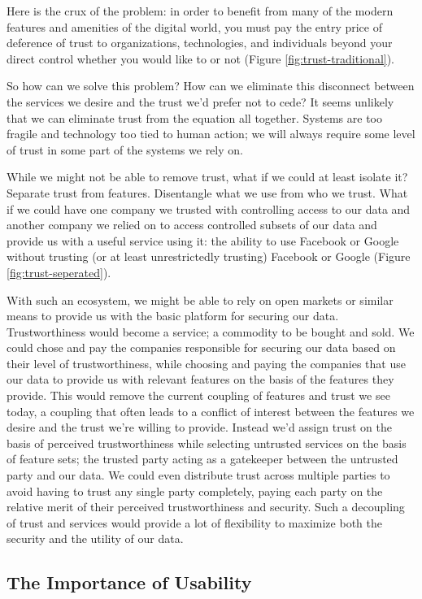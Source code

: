 Here is the crux of the problem: in order to benefit from many of the
modern features and amenities of the digital world, you must pay the
entry price of deference of trust to organizations, technologies, and
individuals beyond your direct control whether you would like to or
not (Figure \ref{fig:trust-traditional}).

So how can we solve this problem? How can we eliminate this disconnect
between the services we desire and the trust we'd prefer not to cede?
It seems unlikely that we can eliminate trust from the equation all
together. Systems are too fragile and technology too tied to human
action; we will always require some level of trust in some part of the
systems we rely on.

While we might not be able to remove trust, what if we could at least
isolate it? Separate trust from features. Disentangle what we use from
who we trust. What if we could have one company we trusted with
controlling access to our data and another company we relied on to
access controlled subsets of our data and provide us with a useful
service using it: the ability to use Facebook or Google without
trusting (or at least unrestrictedly trusting) Facebook or Google
(Figure \ref{fig:trust-seperated}).

With such an ecosystem, we might be able to rely on open markets or
similar means to provide us with the basic platform for securing our
data. Trustworthiness would become a service; a commodity to be bought
and sold. We could chose and pay the companies responsible for
securing our data based on their level of trustworthiness, while
choosing and paying the companies that use our data to provide us with
relevant features on the basis of the features they provide. This
would remove the current coupling of features and trust we see today,
a coupling that often leads to a conflict of interest between the
features we desire and the trust we're willing to provide. Instead
we'd assign trust on the basis of perceived trustworthiness while
selecting untrusted services on the basis of feature sets; the trusted
party acting as a gatekeeper between the untrusted party and our
data. We could even distribute trust across multiple parties to avoid
having to trust any single party completely, paying each party on the
relative merit of their perceived trustworthiness and security. Such a
decoupling of trust and services would provide a lot of flexibility to
maximize both the security and the utility of our data.

\subsection{The Importance of Usability}

